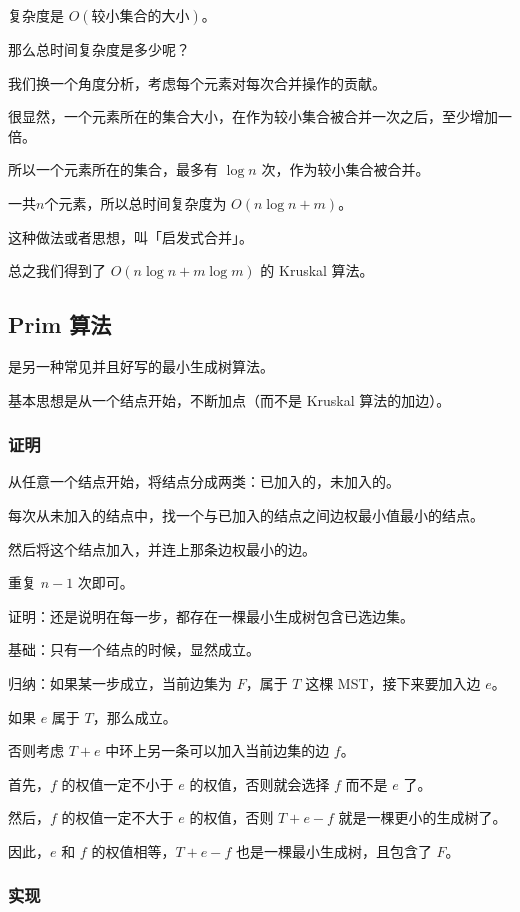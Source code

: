 复杂度是 $O(较小集合的大小)$。

那么总时间复杂度是多少呢？

我们换一个角度分析，考虑每个元素对每次合并操作的贡献。

很显然，一个元素所在的集合大小，在作为较小集合被合并一次之后，至少增加一倍。

所以一个元素所在的集合，最多有 $\log n$ 次，作为较小集合被合并。

一共$n$个元素，所以总时间复杂度为 $O(n \log n + m)$。

这种做法或者思想，叫「启发式合并」。

总之我们得到了 $O(n \log n + m \log m)$ 的 Kruskal 算法。

\subsection{Prim 算法}

是另一种常见并且好写的最小生成树算法。

基本思想是从一个结点开始，不断加点（而不是 Kruskal 算法的加边）。

\subsubsection{证明}

从任意一个结点开始，将结点分成两类：已加入的，未加入的。

每次从未加入的结点中，找一个与已加入的结点之间边权最小值最小的结点。

然后将这个结点加入，并连上那条边权最小的边。

重复 $n-1$ 次即可。

证明：还是说明在每一步，都存在一棵最小生成树包含已选边集。

基础：只有一个结点的时候，显然成立。

归纳：如果某一步成立，当前边集为 $F$，属于 $T$ 这棵 MST，接下来要加入边 $e$。

如果 $e$ 属于 $T$，那么成立。

否则考虑 $T+e$ 中环上另一条可以加入当前边集的边 $f$。

首先，$f$ 的权值一定不小于 $e$ 的权值，否则就会选择 $f$ 而不是 $e$ 了。

然后，$f$ 的权值一定不大于 $e$ 的权值，否则 $T+e-f$ 就是一棵更小的生成树了。

因此，$e$ 和 $f$ 的权值相等，$T+e-f$ 也是一棵最小生成树，且包含了 $F$。

\subsubsection{实现}

